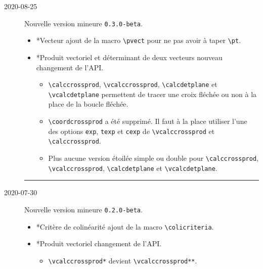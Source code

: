 \documentclass[12pt,a4paper]{article}
\makeatletter
\theoremstyle{definition}
\newcommand\topic{\@ifstar{\@topic@star}{\@topic@no@star}}
\newcommand\@topic@no@star[1]{%
    \textbf{\textsc{#1}.}%
}
\newcommand\@topic@star[1]{%
    \textbf{\textsc{#1} :}%
}
\newcommand\env[1]{\texttt{#1}}
\newcommand\macro[1]{\env{\textbackslash{}#1}}
\newcommand\separation{
    \medskip
    \hfill\rule{0.5\textwidth}{0.75pt}\hfill
    \medskip
}
\makeatother
\begin{document}
\begin{description}

    \medskip
    \item[2020-08-25] Nouvelle version mineure \verb+0.3.0-beta+.
    
    \begin{itemize}[itemsep=.5em]
        \item \topic*{Vecteur}
              ajout de la macro \macro{pvect} pour ne pas avoir à taper \macro{pt}.
    
    
        \item \topic*{Produit vectoriel et déterminant de deux vecteurs} nouveau changement de l'API.
        \begin{itemize}[itemsep=.5em]
            \item \macro{calccrossprod}, \macro{vcalccrossprod}, \macro{calcdetplane} et \macro{vcalcdetplane} permettent de tracer une croix fléchée ou non à la place de la boucle fléchée.
    
            \item \macro{coordcrossprod} a été supprimé. Il faut à la place utiliser l'une des options \verb#exp#, \verb#texp# et \verb#cexp# de \macro{vcalccrossprod} et \macro{calccrossprod}.
    
            \item Plus aucune version étoilée simple ou double pour \macro{calccrossprod}, \macro{vcalccrossprod}, \macro{calcdetplane} et \macro{vcalcdetplane}.
        \end{itemize}
    
    
    \end{itemize}
    
    \separation
    


    \medskip
    \item[2020-07-30] Nouvelle version mineure \verb+0.2.0-beta+.
    
    \begin{itemize}[itemsep=.5em]
        \item \topic*{Critère de colinéarité}
              ajout de la macro \macro{colicriteria}.
    
    
        \item \topic*{Produit vectoriel} changement de l'API.
        \begin{itemize}[itemsep=.5em]
            \item \macro{vcalccrossprod*} devient \macro{vcalccrossprod**}.
    

\end{itemize}
\end{itemize}
\end{description}
\end{document}

